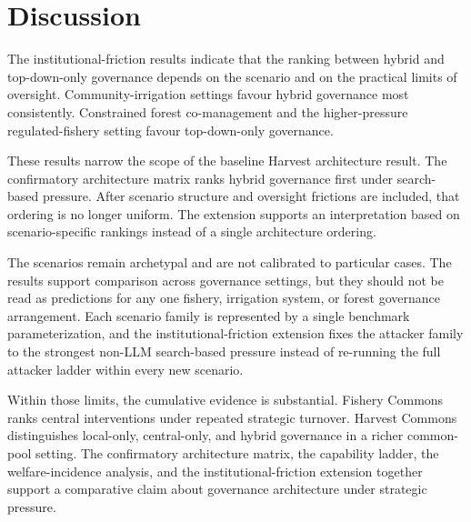 \section{Discussion}

The institutional-friction results indicate that the ranking between hybrid and top-down-only governance depends on the scenario and on the practical limits of oversight. Community-irrigation settings favour hybrid governance most consistently. Constrained forest co-management and the higher-pressure regulated-fishery setting favour top-down-only governance.

These results narrow the scope of the baseline Harvest architecture result. The confirmatory architecture matrix ranks hybrid governance first under search-based pressure. After scenario structure and oversight frictions are included, that ordering is no longer uniform. The extension supports an interpretation based on scenario-specific rankings instead of a single architecture ordering.

The scenarios remain archetypal and are not calibrated to particular cases. The results support comparison across governance settings, but they should not be read as predictions for any one fishery, irrigation system, or forest governance arrangement. Each scenario family is represented by a single benchmark parameterization, and the institutional-friction extension fixes the attacker family to the strongest non-LLM search-based pressure instead of re-running the full attacker ladder within every new scenario.

Within those limits, the cumulative evidence is substantial. Fishery Commons ranks central interventions under repeated strategic turnover. Harvest Commons distinguishes local-only, central-only, and hybrid governance in a richer common-pool setting. The confirmatory architecture matrix, the capability ladder, the welfare-incidence analysis, and the institutional-friction extension together support a comparative claim about governance architecture under strategic pressure.
